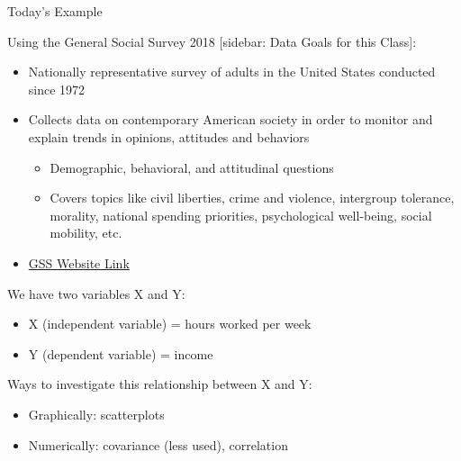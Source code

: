 \documentclass[
  8pt,
  ignorenonframetext,
  dvipsnames]{beamer}
\providecommand{\tightlist}{%
  \setlength{\itemsep}{0pt}\setlength{\parskip}{0pt}}
\let\olditem\item
\renewcommand{\item}{%
  \olditem\vspace{4pt}
}
\begin{document}
\begin{frame}{Today's Example}
\protect\hypertarget{todays-example}{}

Using the General Social Survey 2018 {[}sidebar: Data Goals for this
Class{]}:

\begin{itemize}
\tightlist
\item
  Nationally representative survey of adults in the United States
  conducted since 1972
\item
  Collects data on contemporary American society in order to monitor and
  explain trends in opinions, attitudes and behaviors

  \begin{itemize}
  \tightlist
  \item
    Demographic, behavioral, and attitudinal questions
  \item
    Covers topics like civil liberties, crime and violence, intergroup
    tolerance, morality, national spending priorities, psychological
    well-being, social mobility, etc.
  \end{itemize}
\item
  \href{https://gss.norc.org/}{GSS Website Link}
\end{itemize}

\medskip

We have two variables X and Y:

\begin{itemize}
\tightlist
\item
  X (independent variable) = hours worked per week
\item
  Y (dependent variable) = income
\end{itemize}

\medskip

Ways to investigate this relationship between X and Y:

\begin{itemize}
\tightlist
\item
  Graphically: scatterplots
\item
  Numerically: covariance (less used), correlation
\end{itemize}

\end{frame}
\end{document}
